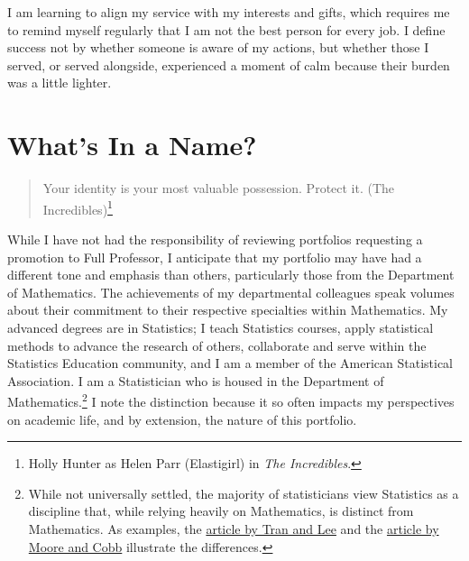 \documentclass[
  letterpaper,
  DIV=11,
  numbers=noendperiod]{scrreprt}
\begin{document}
\begin{tcolorbox}[enhanced jigsaw, toprule=.15mm, arc=.35mm, bottomrule=.15mm, left=2mm, colbacktitle=quarto-callout-tip-color!10!white, toptitle=1mm, colframe=quarto-callout-tip-color-frame, leftrule=.75mm, breakable, bottomtitle=1mm, opacitybacktitle=0.6, titlerule=0mm, opacityback=0, title=\textcolor{quarto-callout-tip-color}{\faLightbulb}\hspace{0.5em}{Operating in Places that Complement My Interests and Gifts}, rightrule=.15mm, colback=white, coltitle=black]

I am learning to align my service with my interests and gifts, which
requires me to remind myself regularly that I am not the best person for
every job. I define success not by whether someone is aware of my
actions, but whether those I served, or served alongside, experienced a
moment of calm because their burden was a little lighter.

\end{tcolorbox}


\chapter{What's In a Name?}\label{whats-in-a-name}

\begin{quote}
Your identity is your most valuable possession. Protect it. (The
Incredibles)\footnote{Holly Hunter as Helen Parr (Elastigirl) in
  \emph{The Incredibles}.}
\end{quote}

While I have not had the responsibility of reviewing portfolios
requesting a promotion to Full Professor, I anticipate that my portfolio
may have had a different tone and emphasis than others, particularly
those from the Department of Mathematics. The achievements of my
departmental colleagues speak volumes about their commitment to their
respective specialties within Mathematics. My advanced degrees are in
Statistics; I teach Statistics courses, apply statistical methods to
advance the research of others, collaborate and serve within the
Statistics Education community, and I am a member of the American
Statistical Association. I am a Statistician who is housed in the
Department of Mathematics.\footnote{While not universally settled, the
  majority of statisticians view Statistics as a discipline that, while
  relying heavily on Mathematics, is distinct from Mathematics. As
  examples, the
  \href{https://fi-courses.s3.amazonaws.com/tsdi/unit_2/Essentials/Statvsmath.pdf}{article
  by Tran and Lee} and the
  \href{https://www.stat.purdue.edu/~dsmoore/articles/Statmath.pdf}{article
  by Moore and Cobb} illustrate the differences.} I note the distinction
because it so often impacts my perspectives on academic life, and by
extension, the nature of this portfolio.
\end{document}

